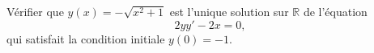 
\begin{exercice}\label{exostarterST-0019}

  Vérifier que $y(x) = -\sqrt{x^2+1}$ est l'unique solution sur $\mathbb{R}$ de l'équation 
    \begin{equation}
      2yy'-2x = 0,
    \end{equation}
    qui satisfait la condition initiale $y(0)=-1$. 
 

\end{exercice}
